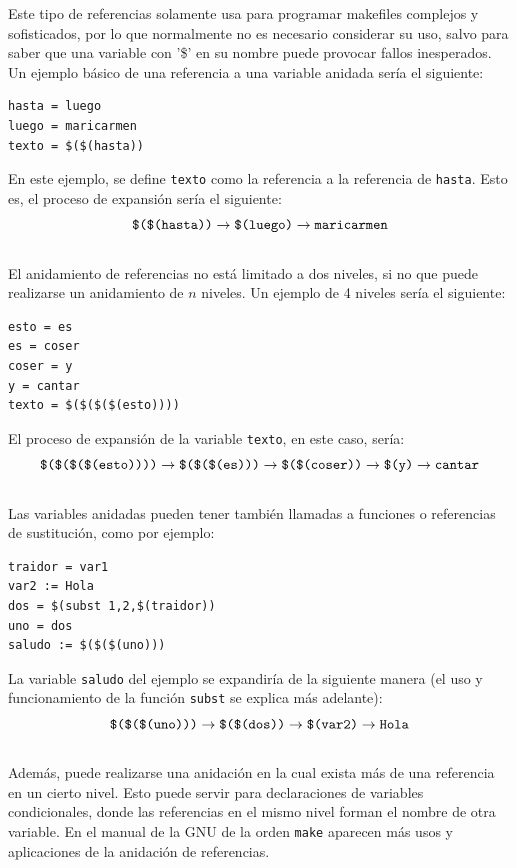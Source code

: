 \documentclass[11pt,twoside,titlepage,a4paper]{article}
\theoremstyle{definition}
\theoremstyle{plain_rojo}
\theoremstyle{remark}
\begin{document}
Este tipo de referencias solamente usa para programar makefiles complejos y 
sofisticados, por lo que normalmente no es necesario considerar su uso, salvo 
para saber que una variable con '\$' en su nombre puede provocar fallos 
inesperados. Un ejemplo básico de una referencia a una variable anidada sería
el siguiente:
\bigskip
\begin{lstlisting}
hasta = luego
luego = maricarmen
texto = $($(hasta))
\end{lstlisting}
\bigskip
En este ejemplo, se define \texttt{texto} como la referencia a la referencia 
de \texttt{hasta}. Esto es, el proceso de expansión sería el siguiente:
\begin{equation*}
\text{\texttt{\$(\$(hasta))}}\rightarrow\text{\texttt{\$(luego)}}
\rightarrow\text{\texttt{maricarmen}}
\end{equation*}
\\
El anidamiento de referencias no está limitado a dos niveles, si no que puede 
realizarse un anidamiento de $n$ niveles. Un ejemplo de 4 niveles sería el 
siguiente:
\bigskip
\begin{lstlisting}
esto = es
es = coser
coser = y
y = cantar
texto = $($($($(esto))))
\end{lstlisting}
\bigskip
El proceso de expansión de la variable \texttt{texto}, en este caso, sería:
\begin{equation*}
\text{\texttt{\$(\$(\$(\$(esto))))}}\rightarrow\text{\texttt{\$(\$(\$(es)))}}
\rightarrow\text{\texttt{\$(\$(coser))}}\rightarrow\text{\texttt{\$(y)}}
\rightarrow\text{\texttt{cantar}}
\end{equation*}
\\
Las variables anidadas pueden tener también llamadas a funciones o 
referencias de sustitución, como por ejemplo:
\bigskip
\begin{lstlisting}
traidor = var1
var2 := Hola
dos = $(subst 1,2,$(traidor))
uno = dos
saludo := $($($(uno)))
\end{lstlisting}
\bigskip
La variable \texttt{saludo} del ejemplo se expandiría de la siguiente manera
(el uso y funcionamiento de la función \texttt{subst} se explica más 
adelante):
\begin{equation*}
\text{\texttt{\$(\$(\$(uno)))}}\rightarrow\text{\texttt{\$(\$(dos))}}
\rightarrow\text{\texttt{\$(var2)}}\rightarrow\text{\texttt{Hola}}
\end{equation*}
\\
Además, puede realizarse una anidación en la cual exista más de una 
referencia en un cierto nivel. Esto puede servir para declaraciones de 
variables condicionales, donde las referencias en el mismo nivel forman el 
nombre de otra variable. En el manual de la GNU de la orden \texttt{make}
aparecen más usos y aplicaciones de la anidación de referencias.
\end{document}

